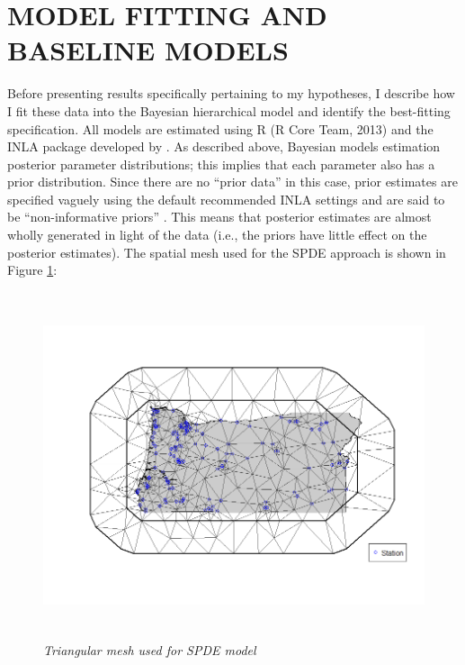 \documentclass[12pt,a4paper,titlepage]{article}
\begin{document}
\section*{\bf\MakeUppercase{Model Fitting and Baseline Models}}

Before presenting results specifically pertaining to my hypotheses, I describe how I fit these data into the Bayesian hierarchical model and identify the best-fitting specification. All models are estimated using R (R Core Team, 2013) and the INLA package developed by \textcite{rue2009}. As described above, Bayesian models estimation posterior parameter distributions; this implies that each parameter also has a prior distribution. Since there are no “prior data” in this case, prior estimates are specified vaguely using the default recommended INLA settings \parencite{rue2009} and are said to be “non-informative priors” \parencite{gelman2013}. This means that posterior estimates are almost wholly generated in light of the data (i.e., the priors have little effect on the posterior estimates). The spatial mesh used for the SPDE approach is shown in Figure \ref{fig:mesh}:

\begin{figure}[!ht]
\graphicspath{ {`/Users/TScott/Google\space Drive/quinalt/APPAM_2014/'}}
\includegraphics[trim = 30mm 34mm 10mm 30mm, clip, width=6in, height=4in]{oregonmeshplot.png}
\noindent
\caption{\textit{Triangular mesh used for SPDE model}}
\label{fig:mesh}
\end{figure}
\end{document}
